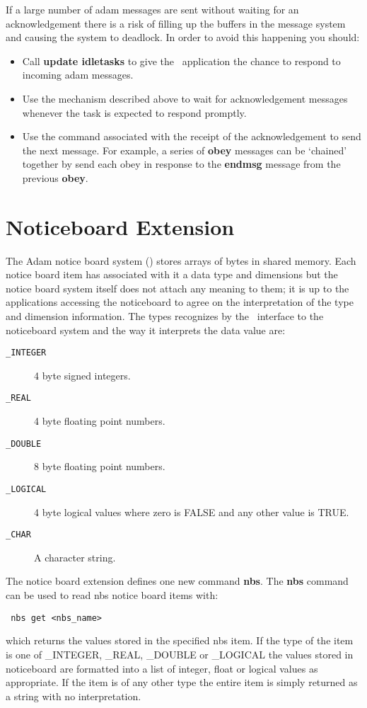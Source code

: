 If a large number of adam messages are sent without waiting for an
acknowledgement there is a risk of filling up the buffers in the message
system and causing the system to deadlock. In order to avoid this
happening you should:
\begin{itemize}
\item Call {\bf update idletasks} to give the \Tcl\ application the chance
to respond to incoming adam messages.
\item Use the mechanism described above to wait for acknowledgement
messages whenever the task is expected to respond promptly.
\item Use the command associated with the receipt of the acknowledgement to
send the next message. For example, a series of {\bf obey} messages can
be `chained'
together by send each obey in response to the {\bf endmsg} message from the
previous {\bf obey}.
\end{itemize}

\section{\label{noticeboard_extension}Noticeboard Extension}

The Adam notice board system () stores arrays of
bytes in shared memory.
Each notice board item has associated with it a data type and dimensions but
the notice board system itself does not attach any meaning to them; it is
up to the applications accessing the noticeboard to agree on the interpretation
of the type and dimension information. The types recognizes by the \TclTk\
interface to the noticeboard system and the way it interprets the data
value are:

\begin{description}
\item[{\tt \_INTEGER}] 4 byte signed integers.
\item[{\tt \_REAL}] 4 byte floating point numbers.
\item[{\tt \_DOUBLE}] 8 byte floating point numbers.
\item[{\tt \_LOGICAL}] 4 byte logical values where zero is FALSE and any
other value is TRUE.
\item[{\tt \_CHAR}] A character string.
\end{description}

The notice board extension defines one new command {\bf nbs}.
The {\bf nbs} command can be used to read nbs notice board items with:
\begin{tquote}{\tt
nbs get <nbs\_name>
}\end{tquote}
which returns the values stored in the specified nbs item. If the type of the
item is one of \_INTEGER, \_REAL, \_DOUBLE or \_LOGICAL the values stored in
noticeboard are formatted into a list of integer, float or logical values as
appropriate. If the item is of any other type the entire item is simply
returned as a string with no interpretation.

